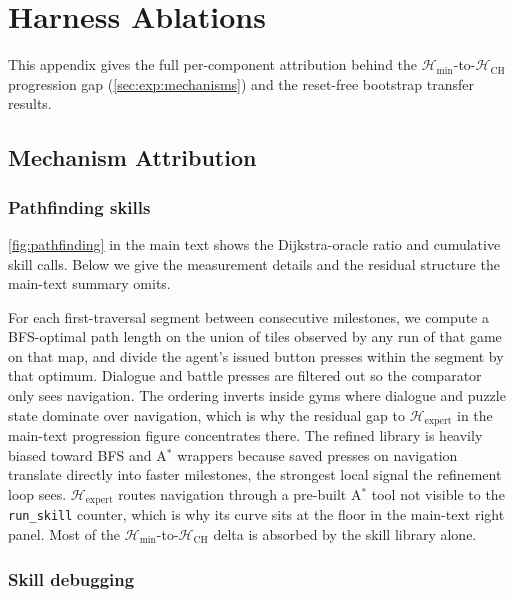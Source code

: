 \documentclass[11pt]{article}
\begin{document}
\section{Harness Ablations}\label{app:ablations}

This appendix gives the full per-component attribution behind the $\mathcal{H}_{\min}$-to-$\mathcal{H}_\mathrm{CH}$ progression gap (\cref{sec:exp:mechanisms}) and the reset-free bootstrap transfer results.

\subsection{Mechanism Attribution}\label{app:mechanisms}

\subsubsection{Pathfinding skills}\label{app:mechanisms:pathfinding}

\cref{fig:pathfinding} in the main text shows the Dijkstra-oracle ratio and cumulative skill calls. Below we give the measurement details and the residual structure the main-text summary omits.

For each first-traversal segment between consecutive milestones, we compute a BFS-optimal path length on the union of tiles observed by any run of that game on that map, and divide the agent's issued button presses within the segment by that optimum. Dialogue and battle presses are filtered out so the comparator only sees navigation. The ordering inverts inside gyms where dialogue and puzzle state dominate over navigation, which is why the residual gap to $\mathcal{H}_\mathrm{expert}$ in the main-text progression figure concentrates there. The refined library is heavily biased toward BFS and A$^*$ wrappers because saved presses on navigation translate directly into faster milestones, the strongest local signal the refinement loop sees. $\mathcal{H}_\mathrm{expert}$ routes navigation through a pre-built A$^*$ tool not visible to the \texttt{run\_skill} counter, which is why its curve sits at the floor in the main-text right panel. Most of the $\mathcal{H}_{\min}$-to-$\mathcal{H}_\mathrm{CH}$ delta is absorbed by the skill library alone.

\subsubsection{Skill debugging}\label{app:mechanisms:debug}
\end{document}

